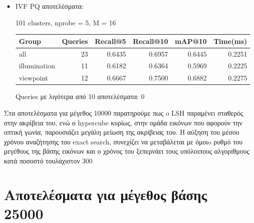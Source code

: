 \documentclass [conference]{IEEEtran}
\begin{document}
\begin{itemize}
    \item IVF PQ αποτελέσματα:
    \begin{table}[H]
    \centering
    \small
    \setlength{\tabcolsep}{3pt}
    101 clusters, nprobe = 5, M = 16
    \par\smallskip
    \begin{tabular}{l r r r r r}
    \hline
    \textbf{Group} & \textbf{Queries} & \textbf{Recall@5} & \textbf{Recall@10} & \textbf{mAP@10} & \textbf{Time(ms)} \\
    \hline
    all & 23 & 0.6435 & 0.6957 & 0.6445 & 0.2251 \\
    illumination & 11 & 0.6182 & 0.6364 & 0.5969 & 0.2225 \\
    viewpoint & 12 & 0.6667 & 0.7500 & 0.6882 & 0.2275 \\
    \hline
    \end{tabular}
    \par\smallskip
    \footnotesize Queries με λιγότερα από 10 αποτελέσματα: 0
    \end{table}

    
\end{itemize}

Στα αποτελέσματα για μέγεθος 10000 παρατηρούμε πως o LSH παραμένει σταθερός στην ακρίβεια του, ενώ ο hypercube κυρίως, στην ομάδα εικόνων που αφορούν την οπτική γωνία, παρουσιάζει μεγάλη μείωση της ακρίβειας του. Η αύξηση του μέσου χρόνου αναζήτησης του exact search, συνεχίζει να μεταβάλεται με όμοιo ρυθμό του μεγέθους της βάσης εικόνων και ο χρόνος του ξεπερνάει τους υπόλοιπους αλγορίθμους κατά ποσοστό τουλάχιστον 300%


\section{Αποτελέσματα για μέγεθος βάσης 25000}
\end{document}
